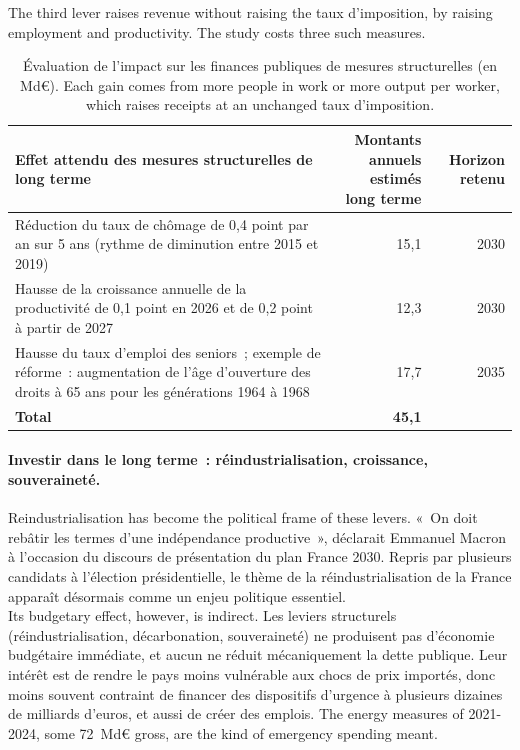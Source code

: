 The third lever raises revenue without raising the taux d'imposition, by raising
employment and productivity. The study costs three such measures.

\begin{table}[h!]
  \centering
  \small
  \begin{tabularx}{\textwidth}{@{}>{\raggedright\arraybackslash}Xrr@{}}
    \toprule
    Effet attendu des mesures structurelles de long terme
      & \shortstack[r]{Montants annuels\\estimés long terme} & Horizon retenu \\
    \midrule
    Réduction du taux de chômage de 0,4 point par an sur 5 ans (rythme de
      diminution entre 2015 et 2019) & 15,1 & 2030 \\
    Hausse de la croissance annuelle de la productivité de 0,1 point en 2026 et
      de 0,2 point à partir de 2027 & 12,3 & 2030 \\
    Hausse du taux d'emploi des seniors~; exemple de réforme~: augmentation de
      l'âge d'ouverture des droits à 65 ans pour les générations 1964 à 1968
      & 17,7 & 2035 \\
    \midrule
    \textbf{Total} & \textbf{45,1} & \\
    \bottomrule
  \end{tabularx}
  \caption*{\small Évaluation de l'impact sur les finances publiques de mesures
    structurelles (en Md€). Each gain comes from more people in work or more
    output per worker, which raises receipts at an unchanged taux d'imposition.}
\end{table}

\paragraph{Investir dans le long terme~: réindustrialisation, croissance, souveraineté.}
Reindustrialisation has become the political frame of these levers.
«~On doit rebâtir les termes d'une indépendance productive~», déclarait
Emmanuel Macron à l'occasion du discours de présentation du plan France 2030.
Repris par plusieurs candidats à l'élection présidentielle, le thème de la
réindustrialisation de la France apparaît désormais comme un enjeu politique
essentiel.\\

Its budgetary effect, however, is indirect. Les leviers structurels
(réindustrialisation, décarbonation, souveraineté) ne produisent pas d'économie
budgétaire immédiate, et aucun ne réduit mécaniquement la dette publique. Leur
intérêt est de rendre le pays moins vulnérable aux chocs de prix importés, donc
moins souvent contraint de financer des dispositifs d'urgence à plusieurs
dizaines de milliards d'euros, et aussi de créer des emplois. The energy
measures of 2021-2024, some 72~Md€ gross, are the kind of emergency spending
meant.

